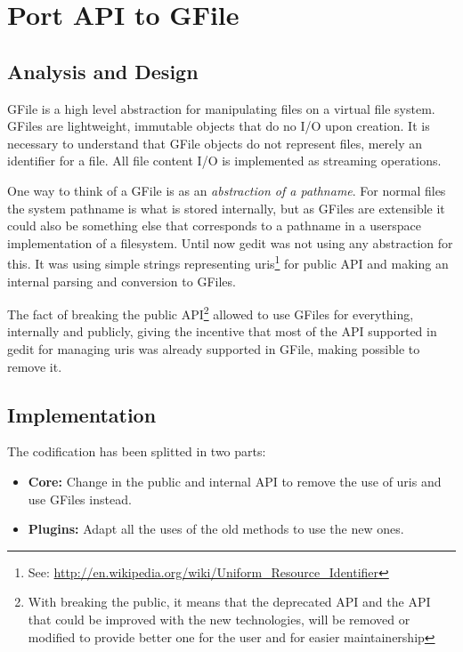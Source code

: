 
\chapter[Port API to GFile]{Port API to GFile}


\section{Analysis and Design}

GFile is a high level abstraction for manipulating files on a virtual file system. GFiles are lightweight, immutable objects that do no I/O upon creation. It is necessary to understand that GFile objects do not represent files, merely an identifier for a file. All file content I/O is implemented as streaming operations.

One way to think of a GFile is as an \emph{abstraction of a pathname}. For normal files the system pathname is what is stored internally, but as GFiles are extensible it could also be something else that corresponds to a pathname in a userspace implementation of a filesystem.\cite{website:gio} Until now gedit was not using any abstraction for this. It was using simple strings representing uris\footnote{See: \url{http://en.wikipedia.org/wiki/Uniform_Resource_Identifier}} for public API and making an internal parsing and conversion to GFiles.

The fact of breaking the public API\footnote{With breaking the public, it means that the deprecated API and the API that could be improved with the new technologies, will be removed or modified to provide better one for the user and for easier maintainership} allowed to use GFiles for everything, internally and publicly, giving the incentive that most of the API supported in gedit for managing uris was already supported in GFile, making possible to remove it.

\newpage
\section{Implementation}

The codification has been splitted in two parts:
\begin{itemize}
  \item \textbf{Core:} Change in the public and internal API to remove the use of uris and use GFiles instead.
  \item \textbf{Plugins:} Adapt all the uses of the old methods to use the new ones.
\end{itemize}

